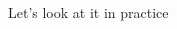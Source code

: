 \documentclass[notes,11pt, aspectratio=169]{beamer}
\begin{document}
\begin{frame}{Let's look at it in practice}
\begin{columns}[onlytextwidth, T]
\begin{column}{.4\textwidth}
      \end{column}%
    \end{columns}
\end{frame}
\end{document}
